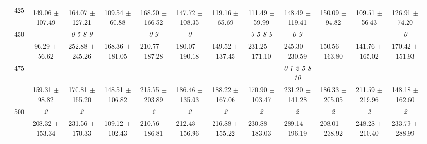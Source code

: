 \begin{table}[h]
{\begin{tabular}{
        ccccccccccccc}
 & \multirow{2}{*}{425}& \cellcolor[HTML]{EFEFEF} & \cellcolor[HTML]{EFEFEF} & \cellcolor[HTML]{EFEFEF} & \cellcolor[HTML]{EFEFEF} & \cellcolor[HTML]{EFEFEF} & \cellcolor[HTML]{EFEFEF} & \cellcolor[HTML]{EFEFEF} & \cellcolor[HTML]{EFEFEF} & \cellcolor[HTML]{EFEFEF} & \cellcolor[HTML]{EFEFEF} & \cellcolor[HTML]{EFEFEF}  \\ 
 & & \cellcolor[HTML]{EFEFEF} 149.06 $\pm$ 107.49& \cellcolor[HTML]{EFEFEF} 164.07 $\pm$ 127.21& \cellcolor[HTML]{EFEFEF} 109.54 $\pm$ 60.88& \cellcolor[HTML]{EFEFEF} 168.20 $\pm$ 166.52& \cellcolor[HTML]{EFEFEF} 147.72 $\pm$ 108.35& \cellcolor[HTML]{EFEFEF} 119.16 $\pm$ 65.69& \cellcolor[HTML]{EFEFEF} 111.49 $\pm$ 59.99& \cellcolor[HTML]{EFEFEF} 148.49 $\pm$ 119.41& \cellcolor[HTML]{EFEFEF} 150.09 $\pm$ 94.82& \cellcolor[HTML]{EFEFEF} 109.51 $\pm$ 56.43& \cellcolor[HTML]{EFEFEF} 126.91 $\pm$ 74.20 \\ 
 & \multirow{2}{*}{450}& & \textit{ 0 5 8 9 }& & \textit{ 0 9 }& \textit{ 0 }& & \textit{ 0 5 8 9 }& \textit{ 0 9 }& & & \textit{ 0 } \\ 
 & & 96.29 $\pm$ 56.62& 252.88 $\pm$ 245.26& 168.36 $\pm$ 181.05& 210.77 $\pm$ 187.28& 180.07 $\pm$ 190.18& 149.52 $\pm$ 137.45& 231.25 $\pm$ 171.10& 245.30 $\pm$ 230.59& 150.56 $\pm$ 163.80& 141.76 $\pm$ 165.02& 170.42 $\pm$ 151.93 \\ 
 & \multirow{2}{*}{475}& \cellcolor[HTML]{EFEFEF} & \cellcolor[HTML]{EFEFEF} & \cellcolor[HTML]{EFEFEF} & \cellcolor[HTML]{EFEFEF} & \cellcolor[HTML]{EFEFEF} & \cellcolor[HTML]{EFEFEF} & \cellcolor[HTML]{EFEFEF} & \cellcolor[HTML]{EFEFEF} \textit{  0  1  2  5  8 10 }& \cellcolor[HTML]{EFEFEF} & \cellcolor[HTML]{EFEFEF} & \cellcolor[HTML]{EFEFEF}  \\ 
 & & \cellcolor[HTML]{EFEFEF} 159.31 $\pm$ 98.82& \cellcolor[HTML]{EFEFEF} 170.81 $\pm$ 155.20& \cellcolor[HTML]{EFEFEF} 148.51 $\pm$ 106.82& \cellcolor[HTML]{EFEFEF} 215.75 $\pm$ 203.89& \cellcolor[HTML]{EFEFEF} 186.46 $\pm$ 135.03& \cellcolor[HTML]{EFEFEF} 188.22 $\pm$ 167.06& \cellcolor[HTML]{EFEFEF} 170.90 $\pm$ 103.47& \cellcolor[HTML]{EFEFEF} 231.20 $\pm$ 141.28& \cellcolor[HTML]{EFEFEF} 186.33 $\pm$ 205.05& \cellcolor[HTML]{EFEFEF} 211.59 $\pm$ 219.96& \cellcolor[HTML]{EFEFEF} 148.18 $\pm$ 162.60 \\ 
 & \multirow{2}{*}{500}& \textit{ 2 }& \textit{ 2 }& & \textit{ 2 }& \textit{ 2 }& \textit{ 2 }& \textit{ 2 }& \textit{ 2 }& \textit{ 2 }& \textit{ 2 }& \textit{ 2 } \\ 
 & & 208.32 $\pm$ 153.34& 231.56 $\pm$ 170.33& 109.12 $\pm$ 102.43& 210.76 $\pm$ 186.81& 212.48 $\pm$ 156.96& 216.88 $\pm$ 155.22& 230.88 $\pm$ 183.03& 289.14 $\pm$ 196.19& 208.01 $\pm$ 238.92& 248.28 $\pm$ 210.40& 233.79 $\pm$ 288.99 \\ 

\end{tabular}}
\end{table}
